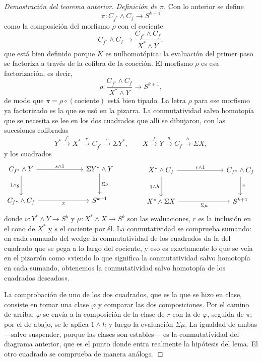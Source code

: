 \begin{proof}[Demostración del teorema anterior]
\emph{Definición de $\pi$.} Con lo anterior se define
\[
\pi\colon C_{f^*}\wedge C_f\longrightarrow S^{k+1}
\]
como la composición del morfismo $\rho$ con el cociente
\[
C_{f^*}\wedge C_f\longrightarrow\frac{C_{f^*}\wedge C_f}{X^*\wedge Y},
\]
que está bien definido porque $K$ es nulhomotópica: la evaluación del primer paso se factoriza a través de la cofibra de la coacción. El morfismo $\rho$ es esa factorización, es decir,
\[
\rho\colon\frac{C_{f^*}\wedge C_f}{X^*\wedge Y}\longrightarrow S^{k+1},
\]
de modo que $\pi=\rho\circ(\text{cociente})$ está bien tipado. La letra $\rho$ para ese morfismo ya factorizado es la que se usó en la pizarra. La conmutatividad salvo homotopía que se necesita se lee en los dos cuadrados que allí se dibujaron, con las sucesiones cofibradas
\[
Y^*\xrightarrow{\ f^*\ }X^*\xrightarrow{\ r\ }C_{f^*}\xrightarrow{\ s\ }\Sigma Y^*,
\qquad
X\xrightarrow{\ f\ }Y\xrightarrow{\ g\ }C_f\xrightarrow{\ h\ }\Sigma X,
\]
y los cuadrados
\[
\begin{tikzcd}[column sep=6.5em, row sep=large]
C_{f^*}\wedge Y \arrow[r,"s\wedge1"] \arrow[d,"1\wedge g"'] & \Sigma Y^*\wedge Y \arrow[d,"\Sigma\nu"]\\
C_{f^*}\wedge C_f \arrow[r,"\pi"'] & S^{k+1}
\end{tikzcd}
\qquad\qquad
\begin{tikzcd}[column sep=6.5em, row sep=large]
X^*\wedge C_f \arrow[r,"r\wedge1"] \arrow[d,"1\wedge h"'] & C_{f^*}\wedge C_f \arrow[d,"\pi"]\\
X^*\wedge\Sigma X \arrow[r,"\Sigma\mu"'] & S^{k+1}
\end{tikzcd}
\]
donde $\nu\colon Y^*\wedge Y\to S^k$ y $\mu\colon X^*\wedge X\to S^k$ son las evaluaciones, $r$ es la inclusión en el cono de $X^*$ y $s$ el cociente por él. La conmutatividad se comprueba sumando: en cada sumando del wedge la conmutatividad de los cuadrados da la del cuadrado que se pega a lo largo del cociente, y eso es exactamente lo que se veía en el pizarrón como «viendo lo que significa la conmutatividad salvo homotopía en cada sumando, obtenemos la conmutatividad salvo homotopía de los cuadrados deseados».

La comprobación de uno de los dos cuadrados, que es la que se hizo en clase, consiste en tomar una clase $\varphi$ y comparar las dos composiciones. Por el camino de arriba, $\varphi$ se envía a la composición de la clase de $r$ con la de $\varphi$, seguida de $\pi$; por el de abajo, se le aplica $1\wedge h$ y luego la evaluación $\Sigma\mu$. La igualdad de ambas ---salvo suspender, porque las clases son estables--- es la conmutatividad del diagrama anterior, que es el punto donde entra realmente la hipótesis del lema. El otro cuadrado se comprueba de manera análoga.


\end{proof}
